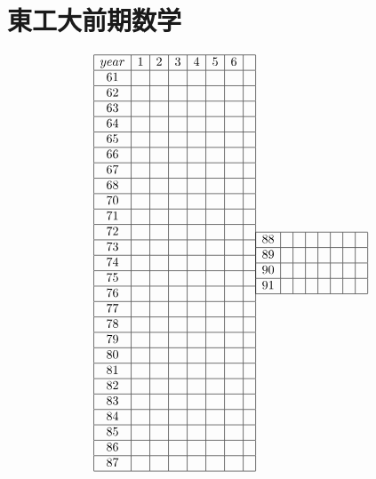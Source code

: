 \documentclass[a4j]{jarticle}
\begin{document}
\section{東工大前期数学}
     \begin{align*}
          \begin{array}{|c|c|c|c|c|c|c|c|} \hline
          year&1&2&3&4&5&6& \\ \hline
          61&&&&&&& \\ \hline
          62&&&&&&& \\ \hline
          63&&&&&&& \\ \hline
          64&&&&&&& \\ \hline
          65&&&&&&& \\ \hline
          66&&&&&&& \\ \hline
          67&&&&&&& \\ \hline
          68&&&&&&& \\ \hline
          70&&&&&&& \\ \hline
          71&&&&&&& \\ \hline
          72&&&&&&& \\ \hline
          73&&&&&&& \\ \hline
          74&&&&&&& \\ \hline
          75&&&&&&& \\ \hline
          76&&&&&&& \\ \hline
          77&&&&&&& \\ \hline
          78&&&&&&& \\ \hline
          79&&&&&&& \\ \hline
          80&&&&&&& \\ \hline
          81&&&&&&& \\ \hline
          82&&&&&&& \\ \hline
          83&&&&&&& \\ \hline
          84&&&&&&& \\ \hline
          85&&&&&&& \\ \hline
          86&&&&&&& \\ \hline
          87&&&&&&& \\ \hline
          \end{array}
          \begin{array}{|c|c|c|c|c|c|c|c|} \hline
          88&&&&&&& \\ \hline
          89&&&&&&& \\ \hline
          90&&&&&&& \\ \hline
          91&&&&&&& \\ \hline

\end{array}
\end{align*}
\end{document}
